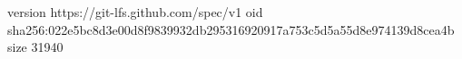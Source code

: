 version https://git-lfs.github.com/spec/v1
oid sha256:022e5bc8d3e00d8f9839932db295316920917a753c5d5a55d8e974139d8cea4b
size 31940
